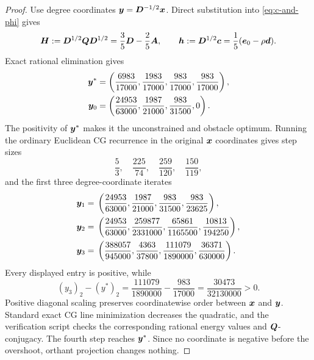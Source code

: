 \begin{proof}
Use degree coordinates $\bm{y}=\bm{D}^{-1/2}\bm{x}$.  Direct substitution into
\cref{eq:c-and-phi} gives
\begin{equation}
 \bm{H}:=\bm{D}^{1/2}\bm{Q}\bm{D}^{1/2}=\frac35\bm{D}-\frac25\bm{A},
 \qquad
 \bm{h}:=\bm{D}^{1/2}\bm{c}=\frac15(\bm{e}_{0}-\rho\bm{d}).
 \label{eq:H-h}
\end{equation}
Exact rational elimination gives
\begin{align}
 \bm{y}^*&=
 \left(\frac{6983}{17000},\frac{1983}{17000},
       \frac{983}{17000},\frac{983}{17000}\right),
 \label{eq:counter-optimum}\\
 \bm{y}_0&=
 \left(\frac{24953}{63000},\frac{1987}{21000},
       \frac{983}{31500},0\right).
 \label{eq:counter-start}
\end{align}
The positivity of $\bm{y}^*$ makes it the unconstrained and obstacle optimum.
Running the ordinary Euclidean CG recurrence in the original $\bm{x}$
coordinates gives step sizes
\begin{equation}
 \frac53,\quad\frac{225}{74},\quad\frac{259}{120},\quad\frac{150}{119},
 \label{eq:counter-steps}
\end{equation}
and the first three degree-coordinate iterates
\begin{align*}
 \bm{y}_1={}&\left(\frac{24953}{63000},\frac{1987}{21000},
  \frac{983}{31500},\frac{983}{23625}\right),\\
 \bm{y}_2={}&\left(\frac{24953}{63000},\frac{259877}{2331000},
  \frac{65861}{1165500},\frac{10813}{194250}\right),\\
 \bm{y}_3={}&\left(\frac{388057}{945000},\frac{4363}{37800},
  \frac{111079}{1890000},\frac{36371}{630000}\right).
\end{align*}
Every displayed entry is positive, while
\[
 (y_3)_2-(y^*)_2
 =\frac{111079}{1890000}-\frac{983}{17000}
 =\frac{30473}{32130000}>0.
\]
Positive diagonal scaling preserves coordinatewise order between $\bm{x}$ and
$\bm{y}$.  Standard exact CG line minimization decreases the quadratic, and the
verification script checks the corresponding rational energy values and
$\bm{Q}$-conjugacy.  The fourth step reaches $\bm{y}^*$.  Since no coordinate is
negative before the overshoot, orthant projection changes nothing.
\end{proof}

